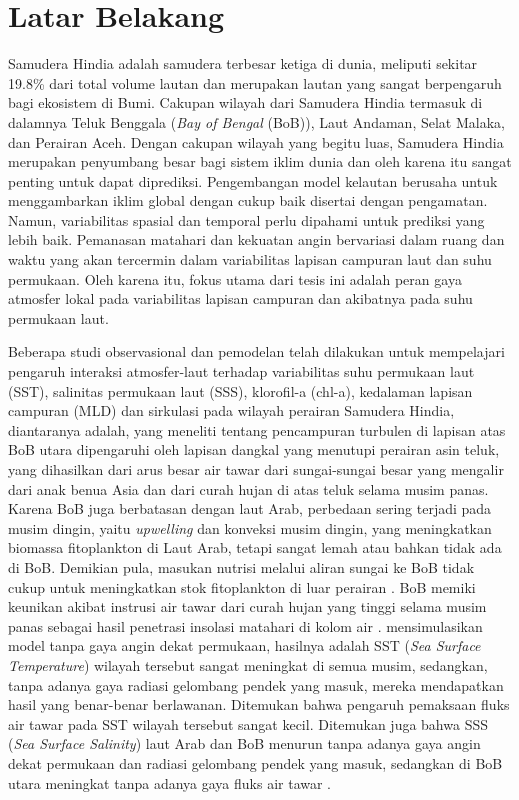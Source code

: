 \vspace{1.5pc}
\section[Latar Belakang]{Latar Belakang}
\begin{spacing}{1.5}
	Samudera Hindia adalah samudera terbesar ketiga di dunia, meliputi sekitar 19.8\% dari total volume lautan  dan merupakan lautan yang sangat berpengaruh bagi ekosistem di Bumi. Cakupan wilayah dari Samudera Hindia termasuk di dalamnya Teluk Benggala (\textit{Bay of Bengal} (BoB)), Laut Andaman, Selat Malaka, dan Perairan Aceh. Dengan cakupan wilayah yang begitu luas, Samudera Hindia merupakan penyumbang besar bagi sistem iklim dunia dan oleh karena itu sangat penting untuk dapat diprediksi. Pengembangan model kelautan berusaha untuk menggambarkan iklim global dengan cukup baik disertai dengan pengamatan. Namun, variabilitas spasial dan temporal perlu dipahami untuk prediksi yang lebih baik. Pemanasan matahari dan kekuatan angin bervariasi dalam ruang dan waktu yang akan tercermin dalam variabilitas lapisan campuran laut dan suhu permukaan. Oleh karena itu, fokus utama dari tesis ini adalah peran gaya atmosfer lokal pada variabilitas lapisan campuran dan akibatnya pada suhu permukaan laut.
	
	Beberapa studi observasional dan pemodelan telah dilakukan untuk mempelajari pengaruh interaksi atmosfer-laut terhadap variabilitas suhu permukaan laut (SST), salinitas permukaan laut (SSS), klorofil-a (chl-a), kedalaman lapisan campuran (MLD) dan sirkulasi pada wilayah perairan Samudera Hindia, diantaranya adalah,  yang meneliti tentang pencampuran turbulen di lapisan atas BoB utara dipengaruhi oleh lapisan dangkal yang menutupi perairan asin teluk, yang dihasilkan dari arus besar air tawar dari sungai-sungai besar yang mengalir dari anak benua Asia dan dari curah hujan di atas teluk selama musim panas. Karena BoB juga berbatasan dengan laut Arab, perbedaan sering terjadi pada musim dingin, yaitu \textit{upwelling} dan konveksi musim dingin, yang meningkatkan biomassa fitoplankton di Laut Arab, tetapi sangat lemah atau bahkan tidak ada di BoB. Demikian pula, masukan nutrisi melalui aliran sungai ke BoB tidak cukup untuk meningkatkan stok fitoplankton di luar perairan . BoB memiki keunikan akibat instrusi air tawar dari curah hujan yang tinggi selama musim panas sebagai hasil penetrasi insolasi matahari di kolom air \cite{Kantha2019}.  mensimulasikan model tanpa gaya angin dekat permukaan, hasilnya adalah SST (\textit{Sea Surface Temperature}) wilayah tersebut sangat meningkat di semua musim, sedangkan, tanpa adanya gaya radiasi gelombang pendek yang masuk, mereka mendapatkan hasil yang benar-benar berlawanan. Ditemukan bahwa pengaruh pemaksaan fluks air tawar pada SST wilayah tersebut sangat kecil. Ditemukan juga bahwa SSS (\textit{Sea Surface Salinity}) laut Arab dan BoB menurun tanpa adanya gaya angin dekat permukaan dan radiasi gelombang pendek yang masuk, sedangkan di BoB utara meningkat tanpa adanya gaya fluks air tawar .
	

\end{spacing}
